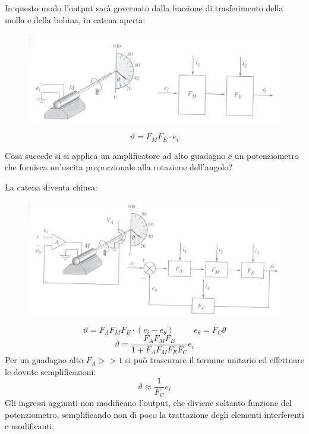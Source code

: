 \documentclass[a4paper, 15pt]{article}
\begin{document}
\begin{adjustwidth}{2in}{}
\begin{itemize}
		In questo modo l'output sarà governato dalla funzione di trasferimento della molla e della bobina, in catena aperta:		
\begin{figure}[H]
	\centering
	\includegraphics[width=0.5\linewidth]{fig/screenshot034}
	\label{fig:screenshot034}
\end{figure}
		\[ \vartheta = F_MF_E\cdot e_i\]
		
		Cosa succede si si applica un amplificatore ad alto guadagno e un potenziometro che fornisca un'uscita proporzionale alla rotazione dell'angolo? 
		
	La catena diventa chiusa:

\begin{figure}[H]
	\centering
	\includegraphics[width=0.5\linewidth]{fig/screenshot035}
	\label{fig:screenshot035}
\end{figure}

		\[\vartheta = F_AF_MF_E\cdot (e_i-e_\theta) \hspace{1cm} e_\theta = F_C\theta\]
		\[ \vartheta = \dfrac{F_AF_MF_E}{1 + F_AF_MF_EF_C}e_i\]
		Per un guadagno alto $F_A >>1$ si può trascurare il termine unitario ed effettuare le dovute semplificazioni:
		\[ \vartheta \approx \dfrac{1}{F_C}e_i\]
		Gli ingressi aggiunti non modificano l'output, che diviene soltanto funzione del potenziometro, semplificando non di poco la trattazione degli elementi interferenti e modificanti. 	
	\end{itemize}


\end{adjustwidth}
\end{document}
